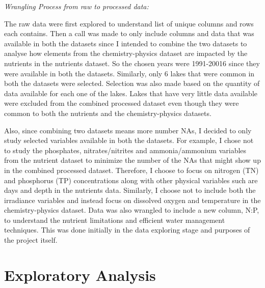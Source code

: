 \documentclass[12pt,]{article}
\newenvironment{Shaded}{\begin{snugshade}}{\end{snugshade}}
\newcommand{\CommentTok}[1]{\textcolor[rgb]{0.56,0.35,0.01}{\textit{#1}}}
\newcommand{\DataTypeTok}[1]{\textcolor[rgb]{0.13,0.29,0.53}{#1}}
\newcommand{\KeywordTok}[1]{\textcolor[rgb]{0.13,0.29,0.53}{\textbf{#1}}}
\newcommand{\NormalTok}[1]{#1}
\newcommand{\OperatorTok}[1]{\textcolor[rgb]{0.81,0.36,0.00}{\textbf{#1}}}
\newcommand{\StringTok}[1]{\textcolor[rgb]{0.31,0.60,0.02}{#1}}
\begin{document}
\emph{Wrangling Process from raw to processed data:}

The raw data were first explored to understand list of unique columns
and rows each contains. Then a call was made to only include columns and
data that was available in both the datasets since I intended to combine
the two datasets to analyse how elements from the chemistry-physics
dataset are impacted by the nutrients in the nutrients dataset. So the
chosen years were 1991-20016 since they were available in both the
datasets. Similarly, only 6 lakes that were common in both the datasets
were selected. Selection was also made based on the quantity of data
available for each one of the lakes. Lakes that have very little data
available were excluded from the combined processed dataset even though
they were common to both the nutrients and the chemistry-physics
datasets.

Also, since combining two datasets means more number NAs, I decided to
only study selected variables available in both the datasets. For
example, I chose not to study the phosphates, nitrates/nitrites and
ammonia/ammonium variables from the nutrient dataset to minimize the
number of the NAs that might show up in the combined processed dataset.
Therefore, I choose to focus on nitrogen (TN) and phosphorus (TP)
concentrations along with other physical variables such are days and
depth in the nutrients data. Similarly, I choose not to include both the
irradiance variables and instead focus on dissolved oxygen and
temperature in the chemistry-physics dataset. Data was also wrangled to
include a new column, N:P, to understand the nutrient limitations and
efficient water management techniques. This was done initially in the
data exploring stage and purposes of the project itself.

\newpage

\hypertarget{exploratory-analysis}{%
\section{Exploratory Analysis}\label{exploratory-analysis}}

\begin{Shaded}
\end{Shaded}
\end{document}

